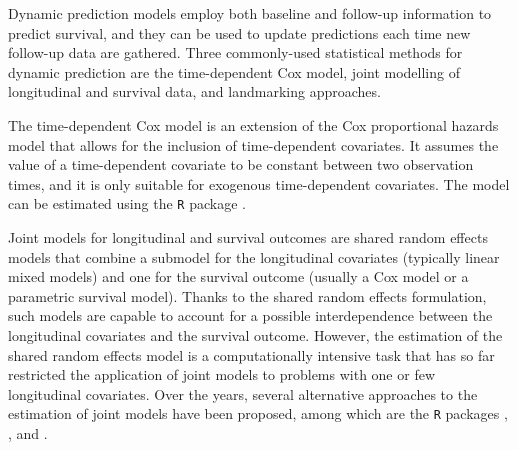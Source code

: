 Dynamic prediction models employ both baseline and follow-up information
to predict survival, and they can be used to update predictions each
time new follow-up data are gathered. Three commonly-used statistical
methods for dynamic prediction are the time-dependent Cox model, joint
modelling of longitudinal and survival data, and landmarking approaches.

The time-dependent Cox model \citep{therneau2000} is an extension of the
Cox proportional hazards model that allows for the inclusion of
time-dependent covariates. It assumes the value of a time-dependent
covariate to be constant between two observation times, and it is only
suitable for exogenous time-dependent covariates. The model can be
estimated using the \texttt{R} package 
\citep{therneau2000}.

Joint models for longitudinal and survival outcomes
\citep{henderson2000} are shared random effects models that combine a
submodel for the longitudinal covariates (typically linear mixed models)
and one for the survival outcome (usually a Cox model or a parametric
survival model). Thanks to the shared random effects formulation, such
models are capable to account for a possible interdependence between the
longitudinal covariates and the survival outcome. However, the
estimation of the shared random effects model is a computationally
intensive task that has so far restricted the application of joint
models to problems with one or few longitudinal covariates. Over the
years, several alternative approaches to the estimation of joint models
have been proposed, among which are the \texttt{R} packages 
\citep{rizopoulos2010},  \citep{rizopoulos2014},
 \citep{philipson2018} and 
\citep{hickey2018}.

